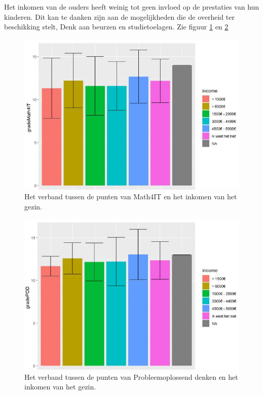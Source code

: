 \documentclass{hogent-article}
\begin{document}
Het inkomen van de ouders heeft weinig tot geen invloed op de prestaties van hun kinderen. Dit kan te danken zijn aan de mogelijkheden die de overheid ter beschikking stelt, Denk aan beurzen en studietoelagen. Zie figuur \ref{fig:gradeMath4IT-FamilyIncome} en \ref{fig:gradePOD-FamilyIncome}
\begin{figure}[h!]
    \includegraphics[width=\linewidth]{gradeMath4IT-FamilyIncome.JPG}
    \caption{Het verband tussen de punten van Math4IT en het inkomen van het gezin.}
    \label{fig:gradeMath4IT-FamilyIncome}
\end{figure}
\begin{figure}[h!]
    \includegraphics[width=\linewidth]{gradePOD-FamilyIncome.JPG}
    \caption{Het verband tussen de punten van Probleemoplossend denken en het inkomen van het gezin.}
    \label{fig:gradePOD-FamilyIncome}
\end{figure}
\end{document}

